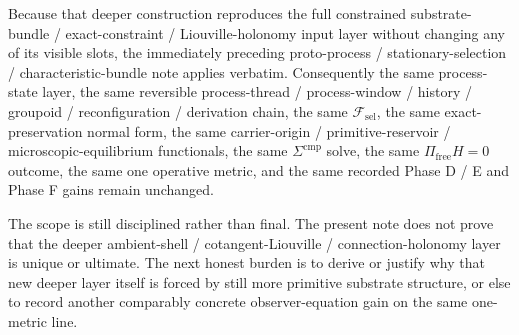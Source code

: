 \documentclass[11pt]{article}
\newcommand{\StemFunctional}{\mathscr F_{\mathrm{sel}}}
\begin{document}
Because that deeper construction reproduces the full constrained substrate-bundle / exact-constraint / Liouville-holonomy input layer without changing any of its visible slots, the immediately preceding proto-process / stationary-selection / characteristic-bundle note applies verbatim. Consequently the same process-state layer, the same reversible process-thread / process-window / history / groupoid / reconfiguration / derivation chain, the same \(\StemFunctional\), the same exact-preservation normal form, the same carrier-origin / primitive-reservoir / microscopic-equilibrium functionals, the same \(\Sigma^{\mathrm{cmp}}\) solve, the same \(\Pi_{\mathrm{free}}H=0\) outcome, the same one operative metric, and the same recorded Phase D / E and Phase F gains remain unchanged.

The scope is still disciplined rather than final. The present note does not prove that the deeper ambient-shell / cotangent-Liouville / connection-holonomy layer is unique or ultimate. The next honest burden is to derive or justify why that new deeper layer itself is forced by still more primitive substrate structure, or else to record another comparably concrete observer-equation gain on the same one-metric line.
\end{document}
